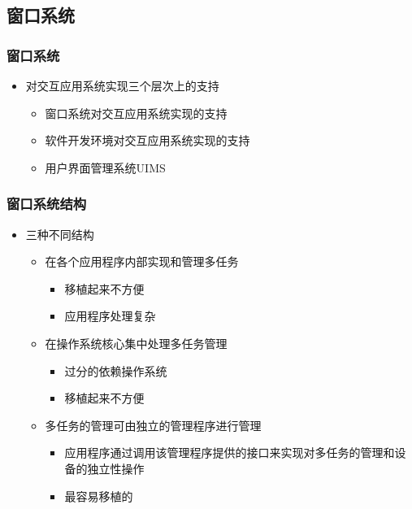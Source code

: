\documentclass{beamer}
\begin{document}
\subsection{窗口系统}
\begin{frame}
	\frametitle{窗口系统}
	\beamertemplatetransparentcovereddynamicmedium
	\begin{itemize}[<+->]
		\item 对交互应用系统实现三个层次上的支持
		\begin{itemize}
			\item 窗口系统对交互应用系统实现的支持
			\item 软件开发环境对交互应用系统实现的支持
			\item 用户界面管理系统UIMS
		\end{itemize}
	\end{itemize}
\end{frame}

\begin{frame}
	\frametitle{窗口系统结构}
	\beamertemplatetransparentcovereddynamicmedium
	\begin{itemize}
		\item 三种不同结构
		\begin{itemize}
			\item 在各个应用程序内部实现和管理多任务
			\begin{itemize}
				\item 移植起来不方便
				\item 应用程序处理复杂
			\end{itemize}
			\pause
			\item 在操作系统核心集中处理多任务管理
			\begin{itemize}
				\item 过分的依赖操作系统
				\item 移植起来不方便
			\end{itemize}
			\pause
			\item 多任务的管理可由独立的管理程序进行管理
			\begin{itemize}
				\item 应用程序通过调用该管理程序提供的接口来实现对多任务的管理和设备的独立性操作
				\item 最容易移植的
			\end{itemize}
		\end{itemize}
	\end{itemize}
\end{frame}
\end{document}
